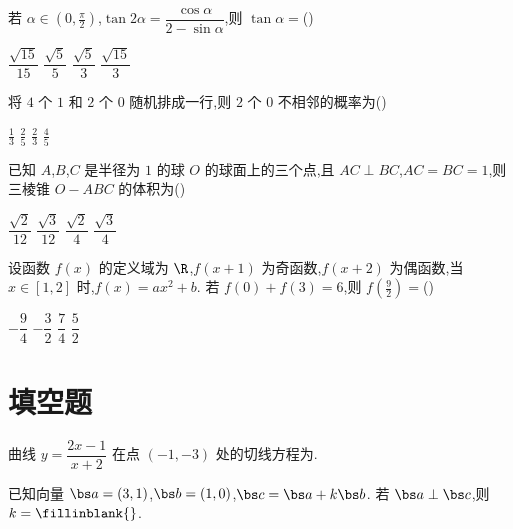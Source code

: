 \begin{problem}
若 \(\alpha\in \left( 0,\frac{\pi}{2} \right)\),\(\tan 2\alpha=\dfrac{\cos \alpha}{2-\sin \alpha}\),则 \(\tan \alpha=\)(\quad)

\choices
    {\(\dfrac{\sqrt{15}}{15}\)}
    {\(\dfrac{\sqrt{5}}{5}\)}
    {\(\dfrac{\sqrt{5}}{3}\)}
    {\(\dfrac{\sqrt{15}}{3}\)}

\end{problem}

\begin{problem}
将 \(4\) 个 \(1\) 和 \(2\) 个 \(0\) 随机排成一行,则 \(2\) 个 \(0\) 不相邻的概率为(\quad)

\choices
    {\(\frac{1}{3}\)}
    {\(\frac{2}{5}\)}
    {\(\frac{2}{3}\)}
    {\(\frac{4}{5}\)}

\end{problem}

\begin{problem}
已知 \(A\),\(B\),\(C\) 是半径为 \(1\) 的球 \(O\) 的球面上的三个点,且 \(AC\perp BC\),\(AC=BC=1\),则三棱锥 \(O-ABC\) 的体积为(\quad)

\choices
    {\(\dfrac{\sqrt{2}}{12}\)}
    {\(\dfrac{\sqrt{3}}{12}\)}
    {\(\dfrac{\sqrt{2}}{4}\)}
    {\(\dfrac{\sqrt{3}}{4}\)}

\end{problem}

\begin{problem}
设函数 \(f(x)\) 的定义域为 \(\R\),\(f(x+1)\) 为奇函数,\(f(x+2)\) 为偶函数,当 \(x\in [1,2]\) 时,\(f(x)=ax^2+b\). 若 \(f(0)+f(3)=6\),则 \(f\left( \frac{9}{2} \right)=\)(\quad)

\choices
    {\(-\dfrac{9}{4}\)}
    {\(-\dfrac{3}{2}\)}
    {\(\dfrac{7}{4}\)}
    {\(\dfrac{5}{2}\)}

\end{problem}

\section{填空题}

\begin{problem}
曲线 \(y=\dfrac{2x-1}{x+2}\) 在点 \((-1,-3)\) 处的切线方程为\fillinblank{}.

\end{problem}

\begin{problem}
已知向量 \(\bs a=(3,1)\),\(\bs b=(1,0)\),\(\bs c=\bs a+k\bs b\). 若 \(\bs a\perp \bs c\),则 \(k=\fillinblank{}\).

\end{problem}

